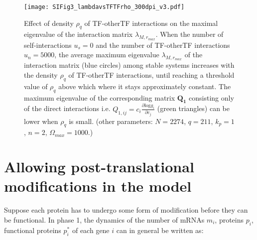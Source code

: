 \documentclass[10pt]{article}
\begin{document}

\begin{figure}[!ht]
    \centering
	\texttt{[image: SIFig3\_lambdavsTFTFrho\_300dpi\_v3.pdf]}
    \caption{Effect of density $\rho_q$ of TF-otherTF interactions on the maximal eigenvalue of the interaction matrix $\lambda_{M,r_{max}}$. When the number of self-interactions $u_s = 0$ and the number of TF-otherTF interactions $u_n = 5000$, the average maximum eigenvalue $\lambda_{M,r_{max}}$ of the interaction matrix (blue circles) among stable systems increases with the density $\rho_q$ of TF-otherTF interactions, until reaching a threshold value of $\rho_q$ above which where it stays approximately constant. The maximum eigenvalue of the corresponding matrix $\mathbf{Q_1}$ consisting only of the direct interactions i.e. $Q_{1,ij} = c_i \frac{\partial \text{log}g_i}{\partial c_j}$ (green triangles) can be lower when $\rho_q$ is small. (other parameters: $N = 2274$, $q = 211$, $k_p = 1$, $n=2$, $\Omega_{max} = 1000$.)}
    \label{SIfig:VaryTTint}
\end{figure}


\section{Allowing post-translational modifications in the model}
\label{sec:PTM}

Suppose each protein has to undergo some form of modification before they can be functional. In phase 1, the dynamics of the number of mRNAs $m_i$, proteins $p_i$, functional proteins $p^*_i$ of each gene $i$ can in general be written as:
\end{document}
